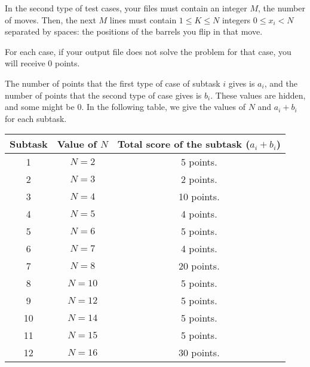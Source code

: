 \documentclass[12pt]{scrartcl}
\begin{document}
        In the second type of test cases, your files must contain an integer $M$, the number of moves. Then, the next $M$ lines must contain $1 \le K \le N$ integers $0 \le x_i < N$ separated by spaces: the positions of the barrels you flip in that move.

    \eject
    

    For each case, if your output file does not solve the problem for that case, you will receive 0 points. 
    
    The number of points that the first type of case of subtask $i$ gives is $a_i$, and the number of points that the second type of case gives is $b_i$. These values are hidden, and some might be 0. In the following table, we give the values of $N$ and $a_i + b_i$ for each subtask.
    
    

    \begin{center}
        \begin{tabular}{|c|c|c|}
            \hline
            Subtask & Value of $N$ & Total score of the subtask ($a_i + b_i$) \\
            \hline
            1 & $N = 2$ & 5 points.  \\
            \hline
            2 & $N = 3$ & 2 points. \\
            \hline
            3 & $N = 4$ & 10 points. \\
            \hline
            4 & $N = 5$ & 4 points. \\
            \hline
            5 & $N = 6$ & 5 points. \\
            \hline
            6 & $N = 7$ & 4 points. \\
            \hline
            7 & $N = 8$ & 20 points. \\
            \hline
            8 & $N = 10$ & 5 points. \\
            \hline
            9 & $N = 12$ & 5 points. \\
            \hline
            10 & $N = 14$ & 5 points. \\
            \hline
            11 & $N = 15$ & 5 points. \\
            \hline
            12 & $N = 16$ & 30 points. \\
            \hline
        \end{tabular}
    \end{center}
    
        

    
    
\end{document}
